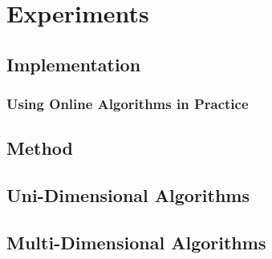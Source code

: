 
\chapter{Experiments}\label{chapter:experiments}

\section{Implementation}

\subsection{Using Online Algorithms in Practice}

\section{Method}

\section{Uni-Dimensional Algorithms}

\section{Multi-Dimensional Algorithms}
